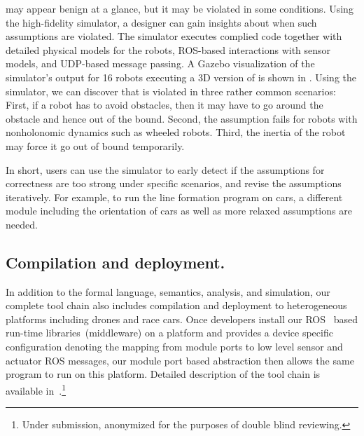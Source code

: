  may appear benign at a glance, but it may be violated in some conditions. Using the high-fidelity \lgname simulator, a designer can gain insights about when such assumptions are violated.
%
The simulator executes complied \lgname code together with detailed physical  models for the robots, ROS-based interactions with sensor models, and UDP-based message passing.
%
A Gazebo visualization of the simulator's output for 16 robots executing a 3D version of \LineForm is shown in .
%
Using the \lgname simulator, we can discover that  is violated in three rather common scenarios:
First, if a robot has to avoid obstacles,
then it may have to go around the obstacle and hence out of the bound.
Second, the assumption fails for robots with nonholonomic dynamics such as wheeled robots. 
Third, the inertia of the robot may force it go out of bound temporarily.

In short, users can use the simulator to early detect if the assumptions for correctness are too strong under specific scenarios, and revise the assumptions iteratively.
For example, to run the line formation program on cars,
a different module including the orientation of cars as well as more relaxed assumptions are needed.

\subsection{Compilation and deployment.}
In addition to the formal language, semantics, analysis, and simulation,
our complete tool chain also includes compilation and deployment to heterogeneous platforms including drones and race cars.
Once developers install our ROS~\cite{ros} based run-time libraries~(middleware) on a platform
and provides a device specific configuration denoting the mapping from \lgname module ports
to low level sensor and actuator ROS messages,
our module port based abstraction then allows the same \lgname program to run on this platform.
Detailed description of the tool chain is available in~\cite{ghosh2019cyphyhouse}.\footnote{Under submission, anonymized for the purposes of double blind reviewing.}

